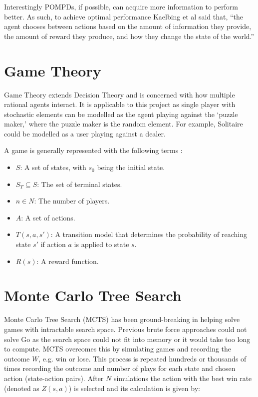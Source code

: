 \documentclass{bhamthesis}
\theoremstyle{definition}
\begin{document}
Interestingly POMPDs, if possible, can acquire more information to perform better. As such, to achieve optimal performance Kaelbing et al \cite{Kaelbling1998} said that, ``the agent chooses between actions based on the amount of information they provide, the amount of reward they produce, and how they change the state of the world.''

\section{Game Theory}
Game Theory extends Decision Theory and is concerned with how multiple rational agents interact. It is applicable to this project as single player with stochastic elements can be modelled as the agent playing against the `puzzle maker,' where the puzzle maker is the random element. For example, Solitaire could be modelled as a user playing against a dealer.

A game is generally represented with the following terms \cite{Browne2012}:

\begin{itemize}
	\item $S$: A set of states, with $s_0$ being the initial state.
	\item $S_T \subseteq S$: The set of terminal states.
	\item $n \in N$: The number of players.
	\item $A$: A set of actions.
	\item $T(s,a,s')$: A transition model that determines the probability of reaching state $s'$ if action $a$ is applied to state $s$.
	\item $R(s)$: A reward function.
\end{itemize}



\section{Monte Carlo Tree Search}\label{s:mcts}
Monte Carlo Tree Search (MCTS) has been ground-breaking in helping solve games with intractable search space. Previous brute force approaches could not solve Go as the search space could not fit into memory or it would take too long to compute. MCTS overcomes this by simulating games and recording the outcome $W$, e.g. win or lose. This process is repeated hundreds or thousands of times recording the outcome and number of plays for each state and chosen action (state-action pairs). After $N$ simulations the action with the best win rate (denoted as $Z(s,a)$) is selected and its calculation is given by:
\end{document}
